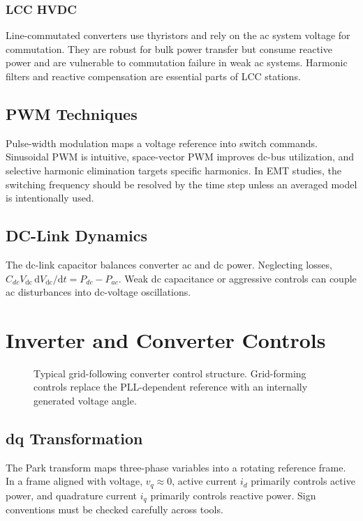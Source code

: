 \documentclass[11pt]{article}
\newcommand{\dd}{\mathrm{d}}
\newcommand{\Vdc}{V_{\mathrm{dc}}}
\begin{document}
\subsubsection{LCC HVDC}
Line-commutated converters use thyristors and rely on the ac system voltage for commutation. They are robust for bulk power transfer but consume reactive power and are vulnerable to commutation failure in weak ac systems. Harmonic filters and reactive compensation are essential parts of LCC stations.

\subsection{PWM Techniques}
Pulse-width modulation maps a voltage reference into switch commands. Sinusoidal PWM is intuitive, space-vector PWM improves dc-bus utilization, and selective harmonic elimination targets specific harmonics. In EMT studies, the switching frequency should be resolved by the time step unless an averaged model is intentionally used.

\subsection{DC-Link Dynamics}
The dc-link capacitor balances converter ac and dc power. Neglecting losses, $C_{dc}\Vdc\,\dd \Vdc/\dd t=P_{dc}-P_{ac}$. Weak dc capacitance or aggressive controls can couple ac disturbances into dc-voltage oscillations.

\section{Inverter and Converter Controls}
\begin{figure}[h]
\centering

\caption{Typical grid-following converter control structure. Grid-forming controls replace the PLL-dependent reference with an internally generated voltage angle.}
\end{figure}

\subsection{dq Transformation}
The Park transform maps three-phase variables into a rotating reference frame. In a frame aligned with voltage, $v_q\approx 0$, active current $i_d$ primarily controls active power, and quadrature current $i_q$ primarily controls reactive power. Sign conventions must be checked carefully across tools.
\end{document}
